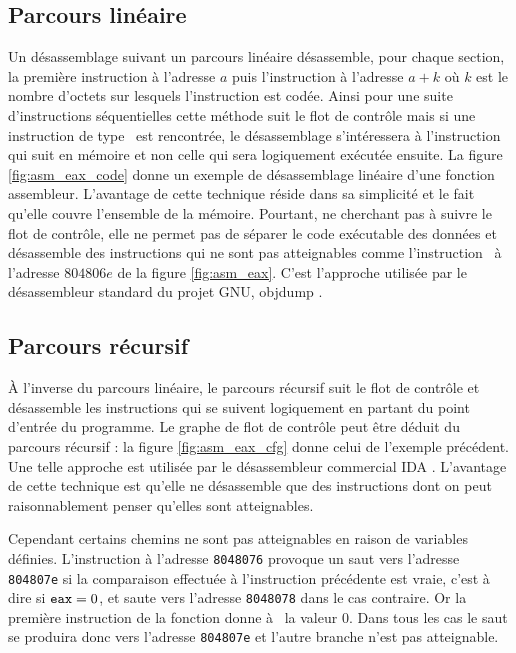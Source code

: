 \subsection{Parcours linéaire}
Un désassemblage suivant un parcours linéaire désassemble, pour chaque section, la première instruction à l'adresse $a$ puis l'instruction à l'adresse $a+k$ où $k$ est le nombre d'octets sur lesquels l'instruction est codée.
Ainsi pour une suite d'instructions séquentielles cette méthode suit le flot de contrôle mais si une instruction de type \jmp\ est rencontrée, le désassemblage s'intéressera à l'instruction qui suit en mémoire et non celle qui sera logiquement exécutée ensuite.
La figure \ref{fig:asm_eax_code} donne un exemple de désassemblage linéaire d'une fonction assembleur.
L'avantage de cette technique réside dans sa simplicité et le fait qu'elle couvre l'ensemble de la mémoire.
Pourtant, ne cherchant pas à suivre le flot de contrôle, elle ne permet pas de séparer le code exécutable des données et désassemble des instructions qui ne sont pas atteignables comme l'instruction \mov\ à l'adresse $804806e$ de la figure \ref{fig:asm_eax}.
C'est l'approche utilisée par le désassembleur standard du projet GNU, objdump \cite{objdump}.

\subsection{Parcours récursif}
À l'inverse du parcours linéaire, le parcours récursif suit le flot de contrôle et désassemble les instructions qui se suivent logiquement en partant du point d'entrée du programme. Le graphe de flot de contrôle peut être déduit du parcours récursif : la figure \ref{fig:asm_eax_cfg} donne celui de l'exemple précédent.
Une telle approche est utilisée par le désassembleur commercial IDA \cite{IDA}.
L'avantage de cette technique est qu'elle ne désassemble que des instructions dont on peut raisonnablement penser qu'elles sont atteignables.

Cependant certains chemins ne sont pas atteignables en raison de variables définies. 
L'instruction à l'adresse \texttt{8048076} provoque un saut vers l'adresse \texttt{804807e} si la comparaison effectuée à l'instruction précédente est vraie, c'est à dire si $\texttt{eax}=0$, et saute vers l'adresse \texttt{8048078} dans le cas contraire.
Or la première instruction de la fonction donne à \eax\ la valeur 0. Dans tous les cas le saut se produira donc vers l'adresse \texttt{804807e} et l'autre branche n'est pas atteignable.

